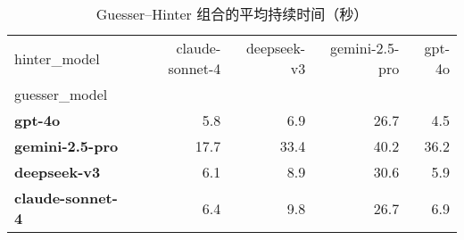 \begin{table}
\caption{Guesser–Hinter 组合的平均持续时间（秒）}
\label{tab:avg_duration}
\begin{tabular}{lrrrr}
\toprule
hinter_model & claude-sonnet-4 & deepseek-v3 & gemini-2.5-pro & gpt-4o \\
guesser_model &  &  &  &  \\
\midrule
\textbf{gpt-4o} & 5.8 & 6.9 & 26.7 & 4.5 \\
\textbf{gemini-2.5-pro} & 17.7 & 33.4 & 40.2 & 36.2 \\
\textbf{deepseek-v3} & 6.1 & 8.9 & 30.6 & 5.9 \\
\textbf{claude-sonnet-4} & 6.4 & 9.8 & 26.7 & 6.9 \\
\bottomrule
\end{tabular}
\end{table}
